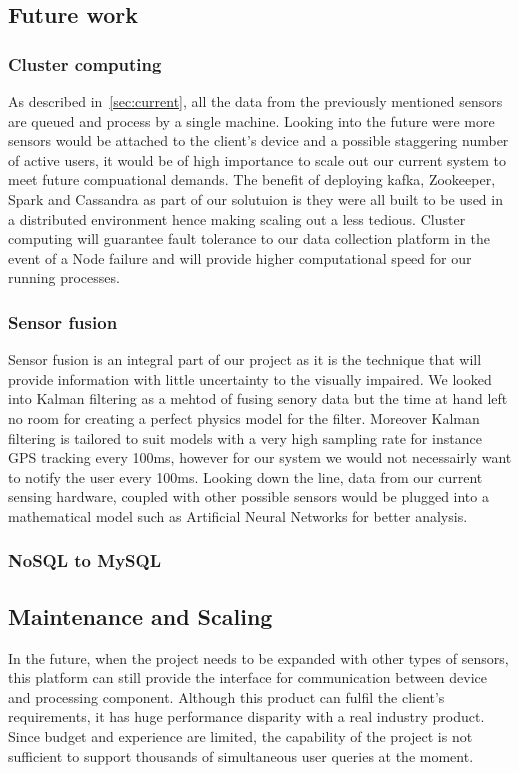 \documentclass[prodmode,acmtosem]{acmsmall} %
\begin{document}
\subsection{Future work}

\subsubsection{Cluster computing}
As described in~\ref{sec:current}, all the data from the previously mentioned sensors are queued and process by a single machine. Looking into the future were more sensors would be attached to the client's device and a possible staggering number of active users, it would be of high importance to scale out our current system to meet future compuational demands. The benefit of deploying kafka, Zookeeper, Spark and Cassandra as part of our solutuion is they were all built to be used in a distributed environment hence making scaling out a less tedious. Cluster computing will guarantee fault tolerance to our data collection platform in the event of a Node failure and will provide higher computational speed for our running processes.

\subsubsection{Sensor fusion}
Sensor fusion is an integral part of our project as it is the technique that will provide information with little uncertainty to the visually impaired. We looked into Kalman filtering as a mehtod of fusing senory data but the time at hand left no room for creating a perfect physics model for the filter. Moreover Kalman filtering is tailored to suit models with a very high sampling rate for instance GPS tracking every 100ms, however for our system we would not necessairly want to notify the user every 100ms. Looking down the line, data from our current sensing hardware, coupled with other possible sensors would be plugged into a mathematical model such as Artificial Neural Networks for better analysis.

\subsubsection{NoSQL to MySQL}


\subsection{Maintenance and Scaling}
In the future, when the project needs to be expanded with other types of sensors, this platform can still provide the interface for communication between device and processing component. 
Although this product can fulfil the client's requirements, it has huge performance disparity with a real industry product. Since budget and experience are limited, the capability of the project is not sufficient to support thousands of simultaneous user queries at the moment.
\end{document}
